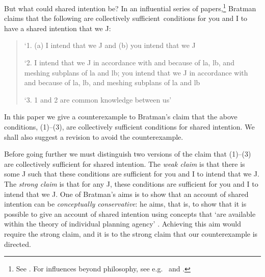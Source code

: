 \documentclass[12pt,\papersize]{extarticle}
\begin{document}
But what could shared intention be?
In an influential series of papers,\footnote{ 
See \citet{Bratman:1992mi,Bratman:1993je,Bratman:1999fr,Bratman:2009lv}.
For influences beyond philosophy, see e.g.\ \citet{Tomasello:2005wx} and \citet{Knoblich:2008hy}. 
}
Bratman claims that the following are collectively sufficient\footnotemark \ conditions for you and I to have a shared intention that we J:
%
%
\begin{quote}
\label{quote:bratman_account}
`1. (a) I intend that we J and (b) you intend that we J
 
`2. I intend that we J in accordance with and because of la, lb, and meshing subplans of la and lb; you intend that we J in accordance with and because of la, lb, and meshing subplans of la and lb
 
`3. 1 and 2 are common knowledge between us' \citep[][p.\ View 4]{Bratman:1993je}
\end{quote}
%
In this paper we give a counterexample to Bratman's  claim that the above conditions, (1)--(3), are collectively sufficient conditions for shared intention. 
We shall also suggest a revision to avoid the counterexample.


Before going further we must distinguish two versions of the claim that (1)--(3) are collectively sufficient for shared intention.
The \emph{weak claim} is that there is some J such that these conditions are sufficient for you and I to intend that we J.
The \emph{strong claim} is that for any J, these conditions are sufficient for you and I to intend that we J.
One of Bratman's aims is to show that an account of shared intention can be \emph{conceptually conservative}:
he aims, that is, to show that it is possible to give an account of shared intention using concepts that `are available within the theory of individual planning agency' \citep[p.\ 163]{Bratman:2009lv}.  
Achieving this aim would require the strong claim, and it is to the strong claim that our counterexample is directed. 
\end{document}

